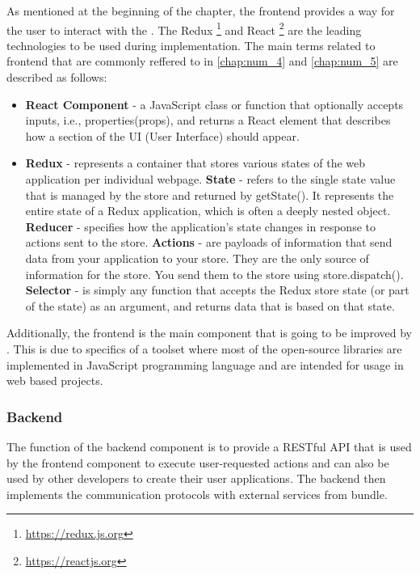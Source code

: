 As mentioned at the beginning of the chapter, the frontend provides a way for the user to interact with the \lpa{}. The Redux \footnote{\url{https://redux.js.org}} and React \footnote{\url{https://reactjs.org}} are the leading technologies to be used during implementation. The main terms related to \lpa{} frontend that are commonly reffered to in \autoref{chap:num_4} and \autoref{chap:num_5} are described as follows:

\begin{itemize}
    \item \textbf{React Component} - a JavaScript class or function that optionally accepts inputs, i.e., properties(props), and returns a React element that describes how a section of the UI (User Interface) should appear. 
    \item \textbf{Redux} - represents a container that stores various states of the web application per individual webpage.
    	\subitem \textbf{State} - refers to the single state value that is managed by the store and returned by getState(). It represents the entire state of a Redux application, which is often a deeply nested object.
        \subitem \textbf{Reducer} - specifies how the application's state changes in response to actions sent to the store.
        \subitem \textbf{Actions} - are payloads of information that send data from your application to your store. They are the only source of information for the store. You send them to the store using store.dispatch().
        \subitem \textbf{Selector} - is simply any function that accepts the Redux store state (or part of the state) as an argument, and returns data that is based on that state.
\end{itemize}

Additionally, the \lpa{} frontend is the main component that is going to be improved by \lpas{}. This is due to specifics of a \solid{} toolset where most of the open-source libraries are implemented in JavaScript programming language and are intended for usage in web based projects.

\subsubsection{Backend}

The function of the backend component is to provide a RESTful \acrfull{API} that is used by the frontend component to execute user-requested actions and can also be used by other developers to create their user applications. The backend then implements the communication protocols with external services from \lps{} bundle. 

